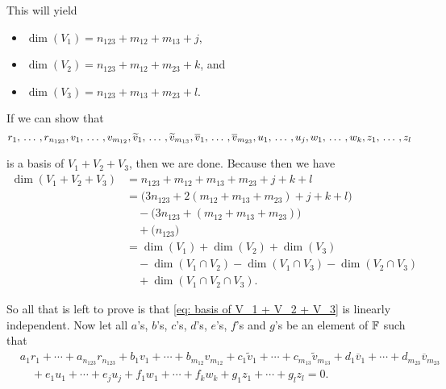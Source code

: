 \begin{xrcs}
This will yield
\begin{itemize}
  \item $\dim (V_1) = n_{123} + m_{12} + m_{13} + j$,
  \item $\dim (V_2) = n_{123} + m_{12} + m_{23} + k$, and
  \item $\dim (V_3) = n_{123} + m_{13} + m_{23} + l$.
\end{itemize}

If we can show that
\begin{equation}
  \label{eq: basis of V_1 + V_2 + V_3}
  r_1, {\, \ldots \,\,}, r_{n_{123}}, v_1, {\, \ldots \,\,}, v_{m_{12}}, \widetilde{v}_1, {\, \ldots \,\,}, \widetilde{v}_{m_{13}}, \overline{v}_1, {\, \ldots \,\,}, \overline{v}_{m_{23}}, u_1, {\, \ldots \,\,}, u_j, w_1, {\, \ldots \,\,}, w_k, z_1, {\, \ldots \,\,}, z_l
\end{equation}

is a basis of $V_1 + V_2 + V_3$, then we are done. Because then we have
\[
\begin{aligned}
  \dim (V_1 + V_2 + V_3) & = n_{123} + m_{12} + m_{13} + m_{23} + j + k + l \\
  & = \Big(3n_{123} + 2(m_{12}+m_{13}+m_{23})+j+k+l \Big) \\
  & \quad - \Big(3n_{123}+(m_{12}+m_{13}+m_{23}) \Big) \\
  & \quad + \Big(n_{123}\Big) \\
  & = \dim (V_1) + \dim (V_2) + \dim (V_3) \\
  & \quad - \dim(V_1 \cap V_2) - \dim (V_1 \cap V_3) - \dim (V_2 \cap V_3) \\
  & \quad + \dim (V_1 \cap V_2 \cap V_3).
\end{aligned}
\]

So all that is left to prove is that \eqref{eq: basis of V_1 + V_2 + V_3} is linearly independent. Now let all $a$'s, $b$'s, $c$'s, $d$'s, $e$'s, $f$'s and $g$'s be an element of $\mathbb{F}$ such that
\begin{equation}
  \label{eq: linear independence formula}
  \begin{aligned}
    &a_1r_1 +  \cdots + a_{n_{123}} r_{n_{123}} + b_1v_1 +  \cdots + b_{m_{12}} v_{m_{12}} +  c_1\widetilde{v}_1 + \cdots + c_{m_{13}}\widetilde{v}_{m_{13}} + d_{1}\overline{v}_1 + \cdots + d_{m_{23}}\overline{v}_{m_{23}} \\
    & \quad + e_{1} u_1 + \cdots + e_j u_j + f_1 w_1 + \cdots + f_k w_k + g_1 z_1 + \cdots + g_l z_l = 0.
  \end{aligned}
\end{equation}


\end{xrcs}
